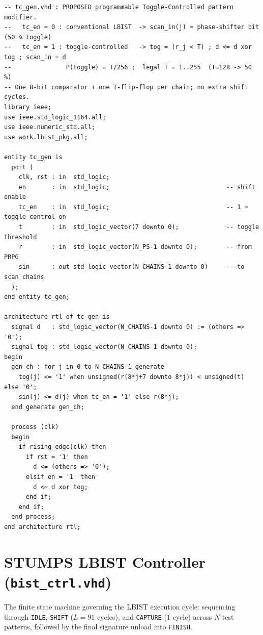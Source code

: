 \documentclass[conference]{IEEEtran}
\begin{document}
\begin{lstlisting}[style=vhdlstyle, caption={Proposed Toggle-Control Generator (\texttt{tc\_gen.vhd})}]
-- tc_gen.vhd : PROPOSED programmable Toggle-Controlled pattern modifier.
--   tc_en = 0 : conventional LBIST  -> scan_in(j) = phase-shifter bit (50 % toggle)
--   tc_en = 1 : toggle-controlled   -> tog = (r_j < T) ; d <= d xor tog ; scan_in = d
--               P(toggle) = T/256 ;  legal T = 1..255  (T=128 -> 50 %)
-- One 8-bit comparator + one T-flip-flop per chain; no extra shift cycles.
library ieee;
use ieee.std_logic_1164.all;
use ieee.numeric_std.all;
use work.lbist_pkg.all;

entity tc_gen is
  port (
    clk, rst : in  std_logic;
    en       : in  std_logic;                                -- shift enable
    tc_en    : in  std_logic;                                -- 1 = toggle control on
    t        : in  std_logic_vector(7 downto 0);             -- toggle threshold
    r        : in  std_logic_vector(N_PS-1 downto 0);        -- from PRPG
    sin      : out std_logic_vector(N_CHAINS-1 downto 0)     -- to scan chains
  );
end entity tc_gen;

architecture rtl of tc_gen is
  signal d   : std_logic_vector(N_CHAINS-1 downto 0) := (others => '0');
  signal tog : std_logic_vector(N_CHAINS-1 downto 0);
begin
  gen_ch : for j in 0 to N_CHAINS-1 generate
    tog(j) <= '1' when unsigned(r(8*j+7 downto 8*j)) < unsigned(t) else '0';
    sin(j) <= d(j) when tc_en = '1' else r(8*j);
  end generate gen_ch;

  process (clk)
  begin
    if rising_edge(clk) then
      if rst = '1' then
        d <= (others => '0');
      elsif en = '1' then
        d <= d xor tog;
      end if;
    end if;
  end process;
end architecture rtl;
\end{lstlisting}

\section{STUMPS LBIST Controller (\texttt{bist\_ctrl.vhd})}
\label{app:bist_ctrl}
The finite state machine governing the LBIST execution cycle: sequencing through \texttt{IDLE}, \texttt{SHIFT} ($L=91$ cycles), and \texttt{CAPTURE} ($1$ cycle) across $N$ test patterns, followed by the final signature unload into \texttt{FINISH}.
\end{document}
